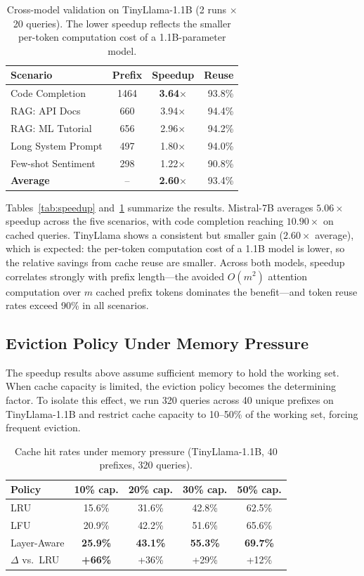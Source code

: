 \documentclass{article}
\begin{document}
\begin{table}[t]
\centering
\caption{Cross-model validation on TinyLlama-1.1B (2 runs $\times$ 20 queries). The lower speedup reflects the smaller per-token computation cost of a 1.1B-parameter model.}
\label{tab:tinyllama}
\small
\begin{tabular}{lccr}
\toprule
Scenario & Prefix & Speedup & Reuse \\
\midrule
Code Completion & 1464 & \textbf{3.64$\times$} & 93.8\% \\
RAG: API Docs & 660 & 3.94$\times$ & 94.4\% \\
RAG: ML Tutorial & 656 & 2.96$\times$ & 94.2\% \\
Long System Prompt & 497 & 1.80$\times$ & 94.0\% \\
Few-shot Sentiment & 298 & 1.22$\times$ & 90.8\% \\
\midrule
\textbf{Average} & -- & \textbf{2.60$\times$} & 93.4\% \\
\bottomrule
\end{tabular}
\end{table}

Tables~\ref{tab:speedup} and~\ref{tab:tinyllama} summarize the results. Mistral-7B averages $5.06\times$ speedup across the five scenarios, with code completion reaching $10.90\times$ on cached queries. TinyLlama shows a consistent but smaller gain ($2.60\times$ average), which is expected: the per-token computation cost of a 1.1B model is lower, so the relative savings from cache reuse are smaller. Across both models, speedup correlates strongly with prefix length---the avoided $O(m^2)$ attention computation over $m$ cached prefix tokens dominates the benefit---and token reuse rates exceed 90\% in all scenarios.

\subsection{Eviction Policy Under Memory Pressure}

The speedup results above assume sufficient memory to hold the working set. When cache capacity is limited, the eviction policy becomes the determining factor. To isolate this effect, we run 320 queries across 40 unique prefixes on TinyLlama-1.1B and restrict cache capacity to 10--50\% of the working set, forcing frequent eviction.

\begin{table}[t]
\centering
\caption{Cache hit rates under memory pressure (TinyLlama-1.1B, 40 prefixes, 320 queries).}
\label{tab:eviction}
\small
\begin{tabular}{lcccc}
\toprule
Policy & 10\% cap. & 20\% cap. & 30\% cap. & 50\% cap. \\
\midrule
LRU & 15.6\% & 31.6\% & 42.8\% & 62.5\% \\
LFU & 20.9\% & 42.2\% & 51.6\% & 65.6\% \\
Layer-Aware & \textbf{25.9\%} & \textbf{43.1\%} & \textbf{55.3\%} & \textbf{69.7\%} \\
\midrule
$\Delta$ vs.\ LRU & \textbf{+66\%} & +36\% & +29\% & +12\% \\
\bottomrule
\end{tabular}
\end{table}
\end{document}
